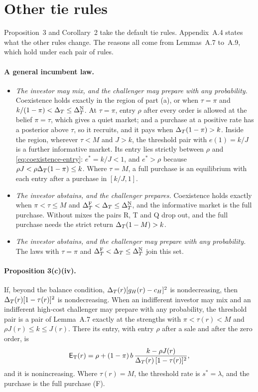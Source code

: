 \section{Other tie rules}\label{sec:coexistence-ties}

Proposition~3 and Corollary~2 take the default tie rules. Appendix~A.4 states what the other rules change. The
reasons all come from Lemmas~A.7 to~A.9, which hold under each pair of rules.

\paragraph{A general incumbent law.}
\begin{itemize}
\item \emph{The investor may mix, and the challenger may prepare with any probability.} Coexistence holds exactly in
the region of part (a), or when \(\tau=\pi\) and \(k/(1-\pi)<\Delta_T\le\Delta_T^{\rm N}\). At \(\tau=\pi\), entry \(\rho\) after
every order is allowed at the belief \(\pi=\tau\), which gives a quiet market; and a purchase at a positive rate has a
posterior above \(\tau\), so it recruits, and it pays when \(\Delta_T(1-\pi)>k\). Inside the region, wherever \(\tau<M\) and
\(J>k\), the threshold pair with \(e(1)=k/J\) is a further informative market. Its entry lies strictly between \(\rho\)
and \eqref{eq:coexistence-entry}: \(e^*=k/J<1\), and \(e^*>\rho\) because \(\rho J<\rho\Delta_T(1-\pi)\le k\). Where
\(\tau=M\), a full purchase is an equilibrium with each entry after a purchase in \([k/J,1]\).
\item \emph{The investor abstains, and the challenger prepares.} Coexistence holds exactly when \(\pi<\tau\le M\) and
\(\Delta_T^{\rm F}<\Delta_T\le\Delta_T^{\rm N}\), and the informative market is the full purchase. Without mixes the pairs R, T and Q
drop out, and the full purchase needs the strict return \(\Delta_T(1-M)>k\).
\item \emph{The investor abstains, and the challenger may prepare with any probability.} The laws with \(\tau=\pi\) and
\(\Delta_T^{\rm F}<\Delta_T\le\Delta_T^{\rm N}\) join this set.
\end{itemize}

\paragraph{Proposition 3(c)(iv).} If, beyond the balance condition, \(\Delta_T(r)[g_H(r)-c_H]^2\) is nondecreasing, then
\(\Delta_T(r)[1-\tau(r)]^2\) is nondecreasing. When an indifferent investor may mix and an indifferent high-cost challenger
may prepare with any probability, the threshold pair is a pair of Lemma~A.7 exactly at the strengths with
\(\pi<\tau(r)<M\) and \(\rho J(r)\le k\le J(r)\). There its entry, with entry \(\rho\) after a sale and after the zero
order, is
\[
\mathsf{E}_{\rm T}(r)=\rho+(1-\pi)\,b\,\frac{k-\rho J(r)}{\Delta_T(r)\,[1-\tau(r)]^2},
\]
and it is nonincreasing. Where \(\tau(r)=M\), the threshold rate is \(s^*=\lambda\), and the purchase is the full
purchase (F).


